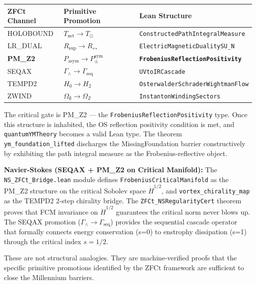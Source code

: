 \documentclass[12pt,a4paper]{article}
\begin{document}
\begin{table}[htbp]
\centering
\small
{}
\begin{tabularx}{\textwidth}{>{\centering\arraybackslash}X >{\centering\arraybackslash}X >{\centering\arraybackslash}X}
\toprule
\rowcolor{gray!25}\textbf{ZFCt Channel} & \textbf{Primitive Promotion} & \textbf{Lean Structure} \\
\midrule
\rowcolors{1}{white}{gray!10}
HOLOBOUND & $T_{\text{net}} \to T_{\odot}$ & \texttt{ConstructedPathIntegralMeasure} \\
LR\_DUAL & $R_{\text{sup}} \to R_{\leftrightarrow}$ & \texttt{ElectricMagneticDualitySU\_N} \\
\textbf{PM\_Z2} & \textbf{$P_{\text{asym}} \to P_{\pm}^{\text{sym}}$} & \textbf{\texttt{FrobeniusReflectionPositivity}} \\
SEQAX & $\Gamma_{\wedge} \to \Gamma_{\text{seq}}$ & \texttt{UVtoIRCascade} \\
TEMPD2 & $H_0 \to H_2$ & \texttt{OsterwalderSchraderWightmanFlow} \\
ZWIND & $\Omega_{\emptyset} \to \Omega_{\mathbb{Z}}$ & \texttt{InstantonWindingSectors} \\
\bottomrule
\end{tabularx}
\end{table}

The critical gate is PM\_Z2 --- the \texttt{FrobeniusReflectionPositivity} type. Once this structure is inhabited, the OS reflection positivity condition is met, and \texttt{quantumYMTheory} becomes a valid Lean type. The theorem \texttt{ym\_foundation\_lifted} discharges the MissingFoundation barrier constructively by exhibiting the path integral measure as the Frobenius-reflective object.

\textbf{Navier-Stokes (SEQAX + PM\_Z2 on Critical Manifold):}
The \texttt{NS\_ZFCt\_Bridge.lean} module defines \texttt{FrobeniusCriticalManifold} as the PM\_Z2 structure on the critical Sobolev space $\dot{H}^{1/2}$, and \texttt{vortex\_chirality\_map} as the TEMPD2 2-step chirality bridge. The \texttt{ZFCt\_NSRegularityCert} theorem proves that FCM invariance on $\dot{H}^{1/2}$ guarantees the critical norm never blows up. The SEQAX promotion ($\Gamma_{\wedge} \to \Gamma_{\text{seq}}$) provides the sequential cascade operator that formally connects energy conservation (s=0) to enstrophy dissipation (s=1) through the critical index $s = 1/2$.

These are not structural analogies. They are machine-verified proofs that the specific primitive promotions identified by the ZFCt framework are sufficient to close the Millennium barriers.
\end{document}

